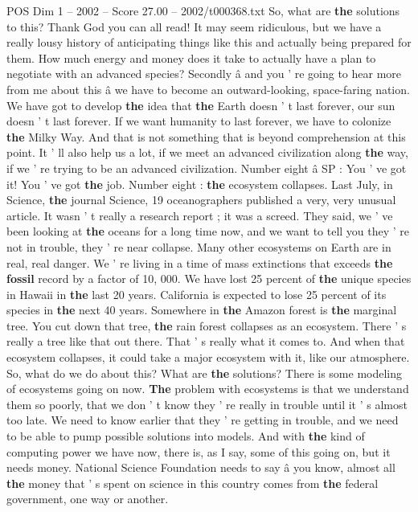 \begin{textsample}{POS Dim 1 – 2002 – Score 27.00 – 2002/t000368.txt}
So, what are \textbf{the} solutions to this?
Thank God you can all read!
It may seem ridiculous, but we have a really lousy history of anticipating things like this and actually being prepared for them.
How much energy and money does it take to actually have a plan to negotiate with an advanced species?
Secondly â and you ' re going to hear more from me about this â we have to become an outward-looking, space-faring nation.
We have got to develop \textbf{the} idea that \textbf{the} Earth doesn ' t last forever, our sun doesn ' t last forever.
If we want humanity to last forever, we have to colonize \textbf{the} Milky Way.
And that is not something that is beyond comprehension at this point.
It ' ll also help us a lot, if we meet an advanced civilization along \textbf{the} way, if we ' re trying to be an advanced civilization.
Number eight â SP : You ' ve got it!
You ' ve got \textbf{the} job.
Number eight : \textbf{the} ecosystem collapses.
Last July, in Science, \textbf{the} journal Science, 19 oceanographers published a very, very unusual article.
It wasn ' t really a research report ; it was a screed.
They said, we ' ve been looking at \textbf{the} oceans for a long time now, and we want to tell you they ' re not in trouble, they ' re near collapse.
Many other ecosystems on Earth are in real, real danger.
We ' re living in a time of mass extinctions that exceeds \textbf{the} \textbf{fossil} record by a factor of 10, 000.
We have lost 25 percent of \textbf{the} unique species in Hawaii in \textbf{the} last 20 years.
California is expected to lose 25 percent of its species in \textbf{the} next 40 years.
Somewhere in \textbf{the} Amazon forest is \textbf{the} marginal tree.
You cut down that tree, \textbf{the} rain forest collapses as an ecosystem.
There ' s really a tree like that out there.
That ' s really what it comes to.
And when that ecosystem collapses, it could take a major ecosystem with it, like our atmosphere.
So, what do we do about this?
What are \textbf{the} solutions?
There is some modeling of ecosystems going on now. \textbf{The} problem with ecosystems is that we understand them so poorly, that we don ' t know they ' re really in trouble until it ' s almost too late.
We need to know earlier that they ' re getting in trouble, and we need to be able to pump possible solutions into models.
And with \textbf{the} kind of computing power we have now, there is, as I say, some of this going on, but it needs money.
National Science Foundation needs to say â you know, almost all \textbf{the} money that ' s spent on science in this country comes from \textbf{the} federal government, one way or another.

\end{textsample}

